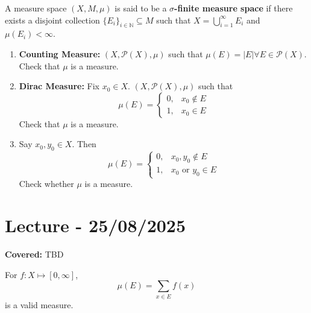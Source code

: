 \documentclass{functionspaces}
\begin{document}
\begin{definition}
A measure space \( (X, M, \mu) \) is said to be a \textbf{$\sigma$-finite measure space} if there exists a disjoint collection \( \{E_{i}\}_{i \in \mathbb{N}} \subseteq M \) such that \( X = \bigcup_{i=1}^{\infty} E_{i} \) and \( \mu(E_{i}) < \infty \).
\end{definition}

\begin{example}
\begin{enumerate}
    \item \textbf{Counting Measure:} \( (X, \mathcal{P}(X), \mu) \) such that \( \mu(E) = |E|  \forall  E \in \mathcal{P}(X) \). Check that \( \mu \) is a measure.
    \item \textbf{Dirac Measure:} Fix \( x_{0} \in X \). \( (X, \mathcal{P}(X), \mu) \) such that 
    \[
    \mu(E) = \begin{cases}
    0, & x_{0} \notin E \\
    1, & x_{0} \in E
    \end{cases}
    \]
    Check that \( \mu \) is a measure.
    \item Say \( x_{0}, y_{0} \in X \). Then 
    \[
    \mu(E) = \begin{cases}
    0, & x_{0}, y_{0} \notin E \\
    1, & x_{0} \text{ or } y_{0} \in E
    \end{cases}
    \]
    Check whether \( \mu \) is a measure.
\end{enumerate}
\end{example}

\endgroup


\newpage
\section{Lecture - 25/08/2025}

\textbf{Covered:} TBD

\begingroup
\setlength{\parskip}{6pt}
\setlength{\parindent}{0pt}

\begin{example}
For \( f: X \mapsto [0, \infty] \),
\[
\mu(E) = \sum_{x \in E} f(x)
\]
is a valid measure.
\end{example}
\end{document}
